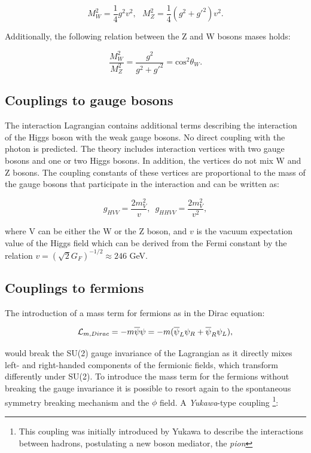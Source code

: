 \begin{equation}
M^2_W=\frac{1}{4}g^2v^2, \, \, \, \, M^2_Z=\frac{1}{4}(g^2+g'^2)v^2.
\end{equation}

Additionally, the following relation between the Z and W bosons mases holds:

\begin{equation}
\frac{M_W^2}{M_Z^2}=\frac{g^2}{g^2+g'^2}=\operatorname{cos^2}\theta_W.
\end{equation}

\subsection{Couplings to gauge bosons}

The interaction Lagrangian contains additional terms describing the interaction of the Higgs boson with the weak gauge bosons. No direct coupling with the photon is predicted. The theory includes interaction vertices with two gauge bosons and one or two Higgs bosons. In addition, the vertices do not mix W and Z bosons. The coupling constants of these vertices are proportional to the mass of the gauge bosons that participate in the interaction and can be written as:

\begin{equation}
g_{HVV}=\frac{2m^2_V}{v}, \,\,\,   g_{HHVV}=\frac{2m^2_V}{v^2},
\end{equation}

where V can be either the W or the Z boson, and $v$ is the vacuum expectation value of the Higgs field which can be derived from the Fermi constant by the relation $v = (\sqrt{2}G_F)^{-1/2} \approx 246$ GeV.

\subsection{Couplings to fermions}

The introduction of a mass term for fermions as in the Dirac equation: 

\begin{equation}
\mathcal{L}_{m,Dirac}= -m\overline{\psi}\psi=-m(\overline{\psi}_L\psi_R+\overline{\psi}_R\psi_L),
\end{equation}

would break the SU(2) gauge invariance of the Lagrangian as it directly mixes left- and right-handed components of the fermionic fields, which transform differently under SU(2). To introduce the mass term for the fermions without breaking the gauge invariance it is possible to resort again to the spontaneous symmetry breaking mechanism and the $\phi$ field. A \emph{Yukawa}-type coupling
\footnote{This coupling was initially introduced by Yukawa \cite{Yukawa:1935xg} to describe the interactions between hadrons, postulating a new boson mediator, the \emph{pion}}:

